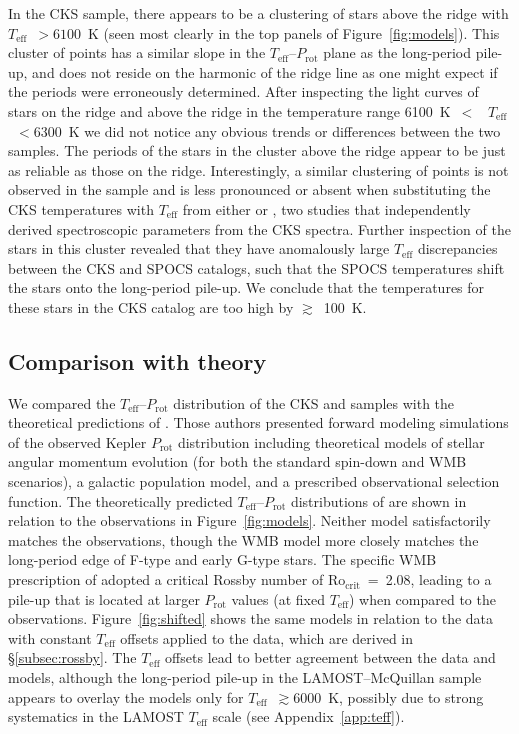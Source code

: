\documentclass[trackchanges,twocolumn]{aastex631}
\newcommand{\rocrit}{$\mathrm{Ro_{crit}}$\xspace}
\newcommand{\lamostmcq}{LAMOST--McQuillan\xspace}
\newcommand{\teff}{\ensuremath{T_{\mathrm{eff}}}\xspace}
\newcommand{\prot}{\ensuremath{P_\mathrm{rot}}\xspace}
\begin{document}
In the CKS sample, there appears to be a clustering of stars above the ridge with \teff~$>6100$~K (seen most clearly in the top panels of Figure~\ref{fig:models}). This cluster of points has a similar slope in the \teff--\prot plane as the long-period pile-up, and does not reside on the harmonic of the ridge line as one might expect if the periods were erroneously determined. After inspecting the light curves of stars on the ridge and above the ridge in the temperature range 6100~K~$<$~ \teff~$<6300$~K we did not notice any obvious trends or differences between the two samples. The periods of the stars in the cluster above the ridge appear to be just as reliable as those on the ridge. Interestingly, a similar clustering of points is not observed in the \edit1{\lamostmcq} sample and is less pronounced or absent when substituting the CKS temperatures with \teff from either \citet{Brewer2018} or \citet{Martinez2019}, two studies that independently derived spectroscopic parameters from the CKS spectra. Further inspection of the stars in this cluster revealed that they have anomalously large \teff discrepancies between the CKS and SPOCS catalogs, such that the SPOCS temperatures shift the stars onto the long-period pile-up. We conclude that the temperatures for these stars in the CKS catalog are too high by $\gtrsim$~100~K.

\subsection{Comparison with theory}
\label{subsec:models}

We compared the \teff--\prot distribution of the CKS and \edit1{\lamostmcq} samples with the theoretical predictions of \citet{vanSaders2019}. Those authors presented forward modeling simulations of the observed Kepler \prot distribution including theoretical models of stellar angular momentum evolution (for both the standard spin-down and WMB scenarios), a galactic population model, and a prescribed observational selection function. The theoretically predicted \teff--\prot distributions of \citet{vanSaders2019} are shown in relation to the observations in Figure~\ref{fig:models}. Neither model satisfactorily matches the observations, though the WMB model more closely matches the long-period edge of F-type and early G-type stars. The specific WMB prescription of \citet{vanSaders2019} adopted a critical Rossby number of \rocrit~=~2.08, leading to a pile-up that is located at larger \prot values (at fixed \teff) when compared to the observations. Figure~\ref{fig:shifted} shows the same models in relation to the data with constant \teff offsets applied to the data, which are derived in \S\ref{subsec:rossby}. The \teff offsets lead to better agreement between the data and models, although the long-period pile-up in the \lamostmcq sample appears to overlay the models only for \teff~$\gtrsim 6000$~K, possibly due to strong systematics in the LAMOST \teff scale (see Appendix~\ref{app:teff}).
\end{document}
